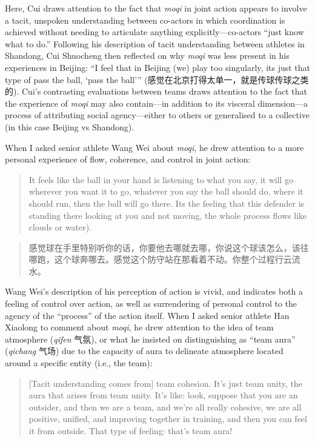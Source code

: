 \begin{CJK}{UTF8}{gbsn}
Here, Cui draws attention to the fact that \textit{moqi} in joint action appears to involve a tacit, unspoken understanding between co-actors in which coordination is achieved without needing to articulate anything explicitly---co-actors ``just know what to do.''   Following his description of tacit understanding between athletes in Shandong, Cui Shuocheng then reflected on why \textit{moqi} was less present in his experiences in Beijing: ``I feel that in Beijing (we) play too singularly, its just that type of pass the ball, `pass the ball'''  (感觉在北京打得太单一，就是传球传球之类的).  Cui's contrasting evaluations  between teams draws attention to the fact that the experience of \textit{moqi} may also contain---in addition to its visceral dimension---a process of attributing social agency---either to others or generalised to a collective (in this case Beijing vs Shandong).

When I asked senior athlete Wang Wei about \textit{moqi}, he drew attention to a more personal experience of flow, coherence, and control in joint action:

  \begin{quote}
    It feels like the ball in your hand is listening to what you say, it will go wherever you want it to go, whatever you say the ball should do, where it should run, then the ball will go there.  Its the feeling that this defender is standing there looking at you and not moving, the whole process flows like clouds or water).
  \end{quote}

  \begin{quote}
        感觉球在手里特别听你的话，你要他去哪就去哪，你说这个球该怎么，该往哪跑，这个球奔哪去。感觉这个防守站在那看着不动。你整个过程行云流水。
  \end{quote}

Wang Wei’s description of his perception of action is vivid, and indicates both a feeling of control over action, as well as surrendering of personal control to the agency of the ``process'' of the action itself.  When I asked senior athlete Han Xiaolong to comment about \textit{moqi}, he drew attention to the idea of team atmosphere (\textit{qifen} 气氛), or what he insisted on distinguishing as ``team aura'' (\textit{qichang} 气场) due to the capacity of aura to delineate atmosphere located around a specific entity (i.e., the team):

    \begin{quote}
      [Tacit understanding comes from] team cohesion.  It's just team unity, the aura that arises from team unity.  It's like: look, suppose that you are an outsider, and then we are a team, and we’re all really cohesive, we are all positive, unified, and improving together in training, and then you can feel it from outside.  That type of feeling: that's team aura!
    \end{quote}


\end{CJK}
